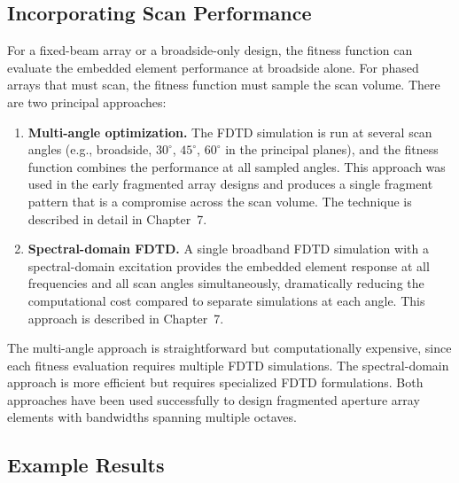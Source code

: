 \subsection{Incorporating Scan Performance}

For a fixed-beam array or a broadside-only design, the fitness function can evaluate the embedded element performance at broadside alone.  For phased arrays that must scan, the fitness function must sample the scan volume.  There are two principal approaches:

\begin{enumerate}
\item \textbf{Multi-angle optimization.}  The FDTD simulation is run at several scan angles (e.g., broadside, $30^{\circ}$, $45^{\circ}$, $60^{\circ}$ in the principal planes), and the fitness function combines the performance at all sampled angles.  This approach was used in the early fragmented array designs and produces a single fragment pattern that is a compromise across the scan volume.  The technique is described in detail in Chapter~7.

\item \textbf{Spectral-domain FDTD.}  A single broadband FDTD simulation with a spectral-domain excitation provides the embedded element response at all frequencies and all scan angles simultaneously, dramatically reducing the computational cost compared to separate simulations at each angle.  This approach is described in Chapter~7.
\end{enumerate}

The multi-angle approach is straightforward but computationally expensive, since each fitness evaluation requires multiple FDTD simulations.  The spectral-domain approach is more efficient but requires specialized FDTD formulations.  Both approaches have been used successfully to design fragmented aperture array elements with bandwidths spanning multiple octaves.

\subsection{Example Results}

